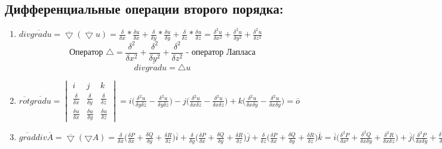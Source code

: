 \documentclass[12pt]{article}
\begin{document}
  \subsection*{Дифференциальные операции второго порядка:}
  \begin{enumerate}
    \item $div \overline{grad}u= \overline{\bigtriangledown}(\overline{\bigtriangledown} u) = 
    \frac{\delta }{\delta x}*\frac{\delta u}{\delta x}+
    \frac{\delta}{\delta y}*\frac{\delta  u}{\delta y}+
    \frac{\delta}{\delta z}*\frac{\delta u}{\delta z}=
    \frac{\delta^2 u}{\delta x^2}+\frac{\delta^2 u}{\delta y^2}+\frac{\delta^2 u}{\delta z^2}$
    \[\text{Оператор }\bigtriangleup = 
    \frac{\delta^2}{\delta x^2 }+\frac{\delta^2}{\delta y^2}+\frac{\delta^2}{\delta z^2} \text{ - оператор Лапласа}\]
    \[div\overline{grad}u=\bigtriangleup u\]

    \item $\overline{rot} \overline{gradu} = 
    \begin{vmatrix}
      i & j & k\\
      \frac{\delta}{\delta x} & \frac{\delta}{\delta y} & \frac{\delta}{\delta z}\\
      \frac{\delta u}{\delta x} & \frac{\delta u}{\delta y} & \frac{\delta u}{\delta z}
    \end{vmatrix}
    =i\Big(\frac{\delta^2 u}{\delta y \delta z}-\frac{\delta^2 u}{\delta y \delta z}\Big)
    -j\Big(\frac{\delta^2 u}{\delta x \delta z}-\frac{\delta^2 u}{\delta x \delta z}\Big)
    +k\Big(\frac{\delta^2 u}{\delta x \delta y}-\frac{\delta^2 u}{\delta x \delta y}\Big)=
    \overline{o}$

    \item $\overline{grad}div \overline{A}=\overline{\bigtriangledown}(\bigtriangledown A)=
    \frac{\delta}{\delta x}\Big(\frac{\delta P}{\delta x}+\frac{\delta Q}{\delta y}+\frac{\delta R}{\delta z}\Big)\overline{i}
  + \frac{\delta}{\delta y}\Big(\frac{\delta P}{\delta x}+\frac{\delta Q}{\delta y}+\frac{\delta R}{\delta z}\Big)\overline{j}
  + \frac{\delta}{\delta z}\Big(\frac{\delta P}{\delta x}+\frac{\delta Q}{\delta y}+\frac{\delta R}{\delta z}\Big)\overline{k}
  = \overline{i}\Big(\frac{\delta^2 P}{\delta x^2}+\frac{\delta^2 Q}{\delta x \delta y}+\frac{\delta^2 R}{\delta x \delta z}\Big)
  + \overline{j}\Big(\frac{\delta^2 P}{\delta x \delta y}+\frac{\delta^2 Q}{\delta y^2}+\frac{\delta^2 R}{\delta x \delta z}\Big)
  + \overline{k}\Big(\frac{\delta^2 P}{\delta x \delta y}+\frac{\delta^2 Q}{\delta y \delta z}+\frac{\delta^2 R}{\delta z^2}\Big)$
    

\end{enumerate}
\end{document}
